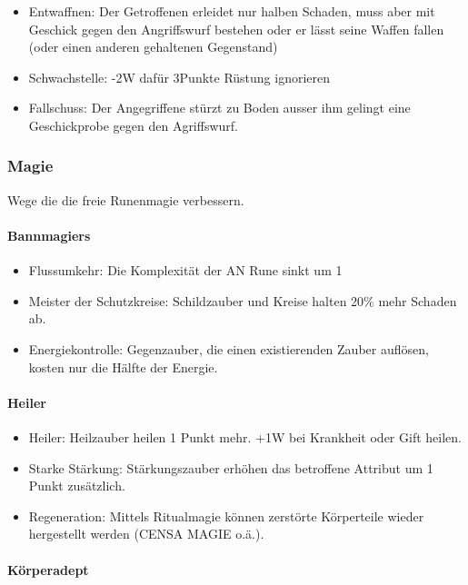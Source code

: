 \documentclass{article}
\begin{document}
\begin{itemize}
\item Entwaffnen: Der Getroffenen erleidet nur halben Schaden, muss aber mit Geschick gegen den Angriffswurf bestehen oder er lässt seine Waffen fallen (oder einen anderen gehaltenen Gegenstand)
\item Schwachstelle: -2W dafür 3Punkte Rüstung ignorieren
\item Fallschuss: Der Angegriffene stürzt zu Boden ausser ihm gelingt eine Geschickprobe gegen den Agriffswurf.
\end{itemize}

\subsubsection{Magie}

Wege die die freie Runenmagie verbessern.

\paragraph{Bannmagiers}

\begin{itemize}
\item Flussumkehr: Die Komplexität der AN Rune sinkt um 1
\item Meister der Schutzkreise: Schildzauber und Kreise halten 20\% mehr Schaden ab.
\item Energiekontrolle: Gegenzauber, die einen existierenden Zauber auflösen, kosten nur die Hälfte der Energie.
\end{itemize}

\paragraph{Heiler}

\begin{itemize}
\item Heiler: Heilzauber heilen 1 Punkt mehr. +1W bei Krankheit oder Gift heilen.
\item Starke Stärkung: Stärkungszauber erhöhen das betroffene Attribut um 1 Punkt zusätzlich.
\item Regeneration: Mittels Ritualmagie können zerstörte Körperteile wieder hergestellt werden (CENSA MAGIE o.ä.).
\end{itemize}

\paragraph{Körperadept}
\end{document}
